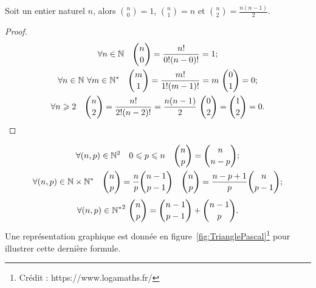 \begin{prop}
  Soit un entier naturel \(n\), alors \(\binom{n}{0} = 1\), \(\binom{n}{1} = n\)
  et \(\binom{n}{2} = \frac{n(n - 1)}{2}\).
\end{prop}

\begin{proof}
  \begin{gather}
    \forall n \in \mathbb{N} \quad \binom{n}{0} = \frac{n!}{0!(n - 0)!} = 1; \\
    \forall n \in \mathbb{N} \ \forall m\in \mathbb{N}^* \quad \binom{m}{1} = \frac{m!}{1!(m -
    1)!} = m \ \binom{0}{1} = 0;\\
    \forall n \geqslant 2 \quad \binom{n}{2} = \frac{n!}{2!(n - 2)!} = \frac{n(n
    - 1)}{2} \ \binom{0}{2} = \binom{1}{2} = 0.
  \end{gather}
\end{proof}

\begin{prop}
  \begin{gather}
    \forall (n, p)\in\mathbb{N}^2 \quad 0\leqslant p \leqslant n \quad \binom{n}{p} =
    \binom{n}{n - p};\\
    \forall (n, p)\in\mathbb{N}\times\mathbb{N}^* \quad \binom{n}{p} = \frac{n}{p}\binom{n -
    1}{p - 1} \quad \binom{n}{p} = \frac{n - p + 1}{p}\binom{n}{p - 1};
  \end{gather}
  \begin{equation}
    \label{eq:TrianglePascal}
    \forall (n, p)\in{\mathbb{N}^*}^2 \ \binom{n}{p} = \binom{n - 1}{p - 1} + \binom{n -
    1}{p}.
  \end{equation}
  Une représentation graphique est donnée en
  figure~\ref{fig:TrianglePascal}\footnote{Crédit : https://www.logamaths.fr/}
  pour illustrer cette dernière formule.
\end{prop}

